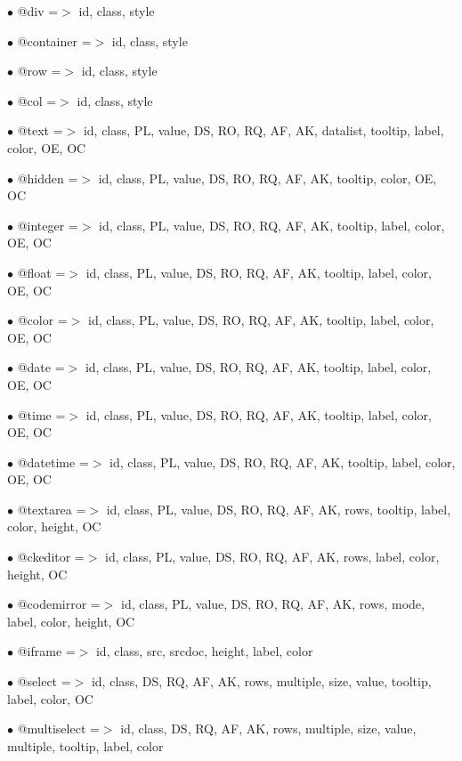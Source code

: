 \documentclass[a4paper]{article}
\begin{document}
\begin{compactitem}
\item[\color{myblue}$\bullet$] @div         =$>$ id, class, style
\item[\color{myblue}$\bullet$] @container   =$>$ id, class, style
\item[\color{myblue}$\bullet$] @row         =$>$ id, class, style
\item[\color{myblue}$\bullet$] @col         =$>$ id, class, style
\item[\color{myblue}$\bullet$] @text        =$>$ id, class, PL, value, DS, RO, RQ, AF, AK, datalist, tooltip, label, color, OE, OC
\item[\color{myblue}$\bullet$] @hidden      =$>$ id, class, PL, value, DS, RO, RQ, AF, AK, tooltip, color, OE, OC
\item[\color{myblue}$\bullet$] @integer     =$>$ id, class, PL, value, DS, RO, RQ, AF, AK, tooltip, label, color, OE, OC
\item[\color{myblue}$\bullet$] @float       =$>$ id, class, PL, value, DS, RO, RQ, AF, AK, tooltip, label, color, OE, OC
\item[\color{myblue}$\bullet$] @color       =$>$ id, class, PL, value, DS, RO, RQ, AF, AK, tooltip, label, color, OE, OC
\item[\color{myblue}$\bullet$] @date        =$>$ id, class, PL, value, DS, RO, RQ, AF, AK, tooltip, label, color, OE, OC
\item[\color{myblue}$\bullet$] @time        =$>$ id, class, PL, value, DS, RO, RQ, AF, AK, tooltip, label, color, OE, OC
\item[\color{myblue}$\bullet$] @datetime    =$>$ id, class, PL, value, DS, RO, RQ, AF, AK, tooltip, label, color, OE, OC
\item[\color{myblue}$\bullet$] @textarea    =$>$ id, class, PL, value, DS, RO, RQ, AF, AK, rows, tooltip, label, color, height, OC
\item[\color{myblue}$\bullet$] @ckeditor    =$>$ id, class, PL, value, DS, RO, RQ, AF, AK, rows, label, color, height, OC
\item[\color{myblue}$\bullet$] @codemirror  =$>$ id, class, PL, value, DS, RO, RQ, AF, AK, rows, mode, label, color, height, OC
\item[\color{myblue}$\bullet$] @iframe      =$>$ id, class, src, srcdoc, height, label, color
\item[\color{myblue}$\bullet$] @select      =$>$ id, class, DS, RQ, AF, AK, rows, multiple, size, value, tooltip, label, color, OC
\item[\color{myblue}$\bullet$] @multiselect =$>$ id, class, DS, RQ, AF, AK, rows, multiple, size, value, multiple, tooltip, label, color

\end{compactitem}
\end{document}
